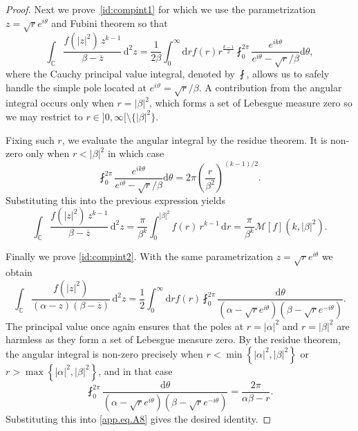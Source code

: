 \documentclass[pdflatex,sn-mathphys-num]{sn-jnl}
\theoremstyle{thmstyleone}
\numberwithin{equation}{section}
\newcommand{\C}{\mathbb{C}}
\begin{document}
\begin{appendices}
\begin{proof}
Next we prove~\eqref{id:compint1} for which we use the parametrization $ z = \sqrt{r} e^{i\theta} $ and Fubini theorem so that
\begin{equation}\label{app.eq.A5}
    \int_{\C} \frac{f(|z|^2)\, z^{k-1}}{\beta - \overline{z}} \, \mathrm{d}^2 z = \frac{1}{2\beta}\int_{0}^{\infty}\mathrm{d}r f(r) r^{\frac{k-1}{2}} \fint_{0}^{2\pi} \frac{e^{ik\theta}}{e^{i\theta} - \sqrt{r}/\beta }\mathrm{d}\theta,
\end{equation}
where the Cauchy principal value integral, denoted by $\fint$, allows us to safely handle the simple pole located at $e^{i\vartheta}=\sqrt{r}/\beta$. A contribution from the angular integral occurs only when $r=|\beta|^2$, which forms a set of Lebesgue measure zero so we may restrict to $r\in]0,\infty[\setminus\{|\beta|^2\}$.

Fixing such $r$, we evaluate the angular integral by the residue theorem. It is non-zero only when $r<|\beta|^2$ in which case 
\begin{equation}
    \fint_{0}^{2\pi}\frac{e^{ik\theta}}{e^{i\theta} - \sqrt{r}/\beta }\mathrm{d}\theta=2\pi\left(\frac{r}{\beta^2}\right)^{(k-1)/2}.
\end{equation}
Substituting this into the previous expression yields
\begin{equation}
\int_{\C} \frac{f(|z|^2)\, z^{k-1}}{\beta - \overline{z}} \, \mathrm{d}^2 z =\frac{\pi}{\beta^k} \int_{0}^{|\beta|^2} f(r)\, r^{k-1} \, \mathrm{d}r = \frac{\pi}{\beta^k} \mathcal{M}[f](k, |\beta|^2).
\end{equation}
 
Finally we prove \eqref{id:compint2}. With the same parametrization $z = \sqrt{r} e^{i\theta}$ we obtain
\begin{equation}\label{app.eq.A8}
\int_{\C} \frac{f(|z|^2)}{(\alpha - z)(\beta - \overline{z})} \, \mathrm{d}^2 z = \frac{1}{2}\int_{0}^{\infty} \mathrm{d}r f(r) \fint_{0}^{2\pi} \frac{\mathrm{d}\theta}{(\alpha - \sqrt{r} e^{i\theta})(\beta - \sqrt{r} e^{-i\theta})}.
\end{equation}
The principal value once again ensures that the poles at $r=|\alpha|^2$ and $r=|\beta|^2$ are harmless as they form a set of Lebesgue measure zero.
By the residue theorem, the angular integral is non-zero precisely when $r<\min\left\{ \left| \alpha \right|^{2},\left| \beta \right|^{2} \right\}$ or $r>\max\left\{ \left| \alpha \right|^{2},\left| \beta \right|^{2} \right\}$, and in that case
\begin{equation}
    \fint_{0}^{2\pi} \frac{\mathrm{d}\theta}{(\alpha - \sqrt{r} e^{i\theta})(\beta - \sqrt{r} e^{-i\theta})}=\frac{2\pi}{\alpha\beta-r}.
\end{equation}
Substituting this into \eqref{app.eq.A8} gives the desired identity.
\end{proof}


\end{appendices}
\end{document}
